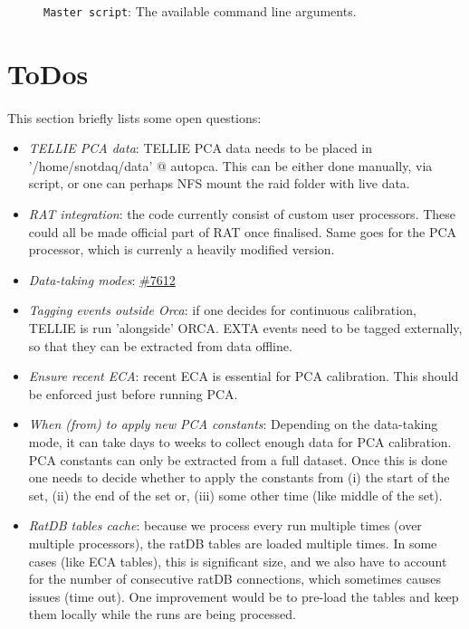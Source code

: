 \documentclass[12pt]{article}
\begin{document}
\begin{figure}
\centering
\noindent{}
  \caption{\centering \texttt{Master script}: The available command line arguments.}
  \label{fig:args}
\end{figure}

\clearpage

\section{ToDos}
\paragraph{}
This section briefly lists some open questions:
\begin{itemize}
	\item \textit{TELLIE PCA data}: TELLIE PCA data needs to be placed in '/home/snotdaq/data' @ autopca. This can be either done manually, via script, or one can perhaps NFS mount the raid folder with live data.
	\item \textit{RAT integration}: the code currently consist of custom user processors. These could all be made official part of RAT once finalised. Same goes for the PCA processor, which is currenly a heavily modified version.
	\item \textit{Data-taking modes}: \href{https://www.snolab.ca/snoplus/private/DocDB/cgi/ShowDocument?docid=7612}{\#7612}
	\item \textit{Tagging events outside Orca}: if one decides for continuous calibration, TELLIE is run 'alongside' ORCA. EXTA events need to be tagged externally, so that they can be extracted from data offline.
	\item \textit{Ensure recent ECA}: recent ECA is essential for PCA calibration. This should be enforced just before running PCA.
	\item \textit{When (from) to apply new PCA constants}: Depending on the data-taking mode, it can take days to weeks to collect enough data for PCA calibration. PCA constants can only be extracted from a full dataset. Once this is done one needs to decide whether to apply the constants from (i) the start of the set, (ii) the end of the set or, (iii) some other time (like middle of the set).
	\item \textit{RatDB tables cache}: because we process every run multiple times (over multiple processors), the ratDB tables are loaded multiple times. In some cases (like ECA tables), this is significant size, and we also have to account for the number of consecutive ratDB connections, which sometimes causes issues (time out). One improvement would be to pre-load the tables and keep them locally while the runs are being processed. 
\end{itemize}
\end{document}
